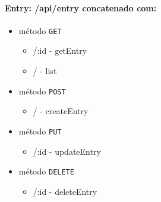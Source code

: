 \paragraph{Entry: /api/entry concatenado com:}
        \begin{itemize}
            \item método \texttt{GET}
                \begin{itemize}
                    \item /:id - getEntry
                    \item / - list
                \end{itemize}
            \item método \texttt{POST}
                \begin{itemize}
                    \item / - createEntry
                \end{itemize}
            \item método \texttt{PUT}
                \begin{itemize}
                    \item /:id - updateEntry
                \end{itemize}
            \item método \texttt{DELETE}
                \begin{itemize}
                    \item /:id - deleteEntry
                \end{itemize}
        \end{itemize}

